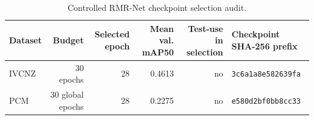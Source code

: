 \begin{table}[!t]
\centering
\caption{Controlled RMR-Net checkpoint selection audit.}
\label{tab:checkpoint_manifest}
\scriptsize
\setlength{\tabcolsep}{3pt}
\begin{tabular}{lrrrrl}
\toprule
Dataset & Budget & Selected epoch & Mean val. mAP50 & Test-use in selection & Checkpoint SHA-256 prefix \\
\midrule
IVCNZ & 30 epochs & 28 & 0.4613 & no & \texttt{3c6a1a8e582639fa} \\
PCM & 30 global epochs & 28 & 0.2275 & no & \texttt{e580d2bf0bb8cc33} \\
\bottomrule
\end{tabular}
\end{table}
